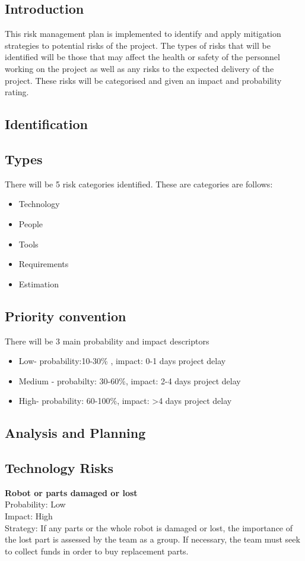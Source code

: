 \documentclass[11pt, a4paper]{article}
\begin{document}
		\subsection{Introduction}
		This risk management plan is implemented to identify and apply mitigation strategies to potential risks of the project. 
		The types of risks that will be identified will be those that may affect the health or safety of the personnel working on the project as well as 
		any risks to the expected delivery of the project. These risks will be categorised and given an impact and probability rating.
		\subsection{Identification}
			\subsection*{Types}
			There will be 5 risk categories identified. These are categories are follows: 
			\begin{itemize}
			\item Technology
			\item People
			\item Tools
			\item Requirements
			\item Estimation
			\end{itemize}	
			\subsection*{Priority convention}	
			There will be 3 main probability and impact  descriptors
			\begin{itemize}
			\item Low- probability:10-30\% , impact: 0-1 days project delay
			\item Medium - probabilty: 30-60\%, impact: 2-4 days project delay
			\item High- probability: 60-100\%, impact: >4 days project delay 
			\end{itemize}			
			
		\subsection{Analysis  and Planning}
			\subsection*{Technology Risks}
			\textbf{Robot or parts damaged or lost}\\
			Probability: Low\\
			Impact: High\\
			Strategy: If any parts or the whole robot is damaged or lost, the importance of the lost part is assessed by the team as a group. If necessary, the team must seek to collect funds in order to buy replacement parts.\\	
	
\end{document}
